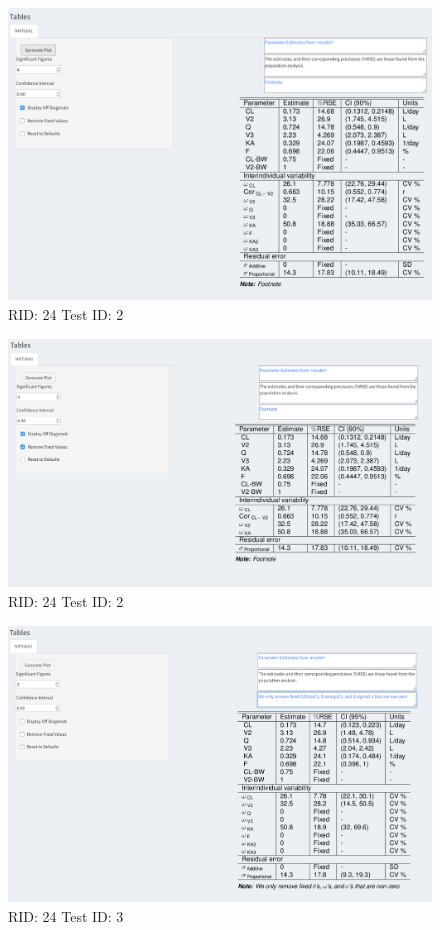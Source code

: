 \documentclass{article}
\begin{document}
\begin{figure}[H]
\includegraphics[width=.8\textwidth]{screencaps/24-2-4.png}
\caption{RID: 24 Test ID: 2}
\end{figure}


\begin{figure}[H]
\includegraphics[width=.8\textwidth]{screencaps/24-2-5.png}
\caption{RID: 24 Test ID: 2}
\end{figure}

\begin{figure}[H]
\includegraphics[width=.8\textwidth]{screencaps/24-3-1.png}
\caption{RID: 24 Test ID: 3}
\end{figure}
\end{document}
